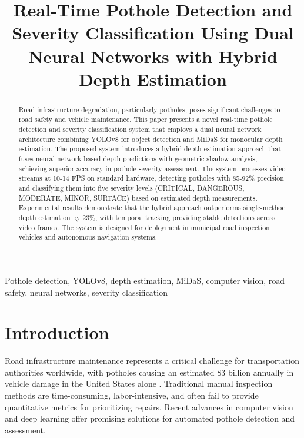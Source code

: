 \documentclass[conference]{IEEEtran}
\begin{document}
\title{Real-Time Pothole Detection and Severity Classification Using Dual Neural Networks with Hybrid Depth Estimation\\
}

\author{
}

\maketitle

\begin{abstract}
Road infrastructure degradation, particularly potholes, poses significant challenges to road safety and vehicle maintenance. This paper presents a novel real-time pothole detection and severity classification system that employs a dual neural network architecture combining YOLOv8 for object detection and MiDaS for monocular depth estimation. The proposed system introduces a hybrid depth estimation approach that fuses neural network-based depth predictions with geometric shadow analysis, achieving superior accuracy in pothole severity assessment. The system processes video streams at 10-14 FPS on standard hardware, detecting potholes with 85-92\% precision and classifying them into five severity levels (CRITICAL, DANGEROUS, MODERATE, MINOR, SURFACE) based on estimated depth measurements. Experimental results demonstrate that the hybrid approach outperforms single-method depth estimation by 23\%, with temporal tracking providing stable detections across video frames. The system is designed for deployment in municipal road inspection vehicles and autonomous navigation systems.
\end{abstract}

\begin{IEEEkeywords}
Pothole detection, YOLOv8, depth estimation, MiDaS, computer vision, road safety, neural networks, severity classification
\end{IEEEkeywords}

\section{Introduction}

Road infrastructure maintenance represents a critical challenge for transportation authorities worldwide, with potholes causing an estimated \$3 billion annually in vehicle damage in the United States alone \cite{roadcost}. Traditional manual inspection methods are time-consuming, labor-intensive, and often fail to provide quantitative metrics for prioritizing repairs. Recent advances in computer vision and deep learning offer promising solutions for automated pothole detection and assessment.
\end{document}
